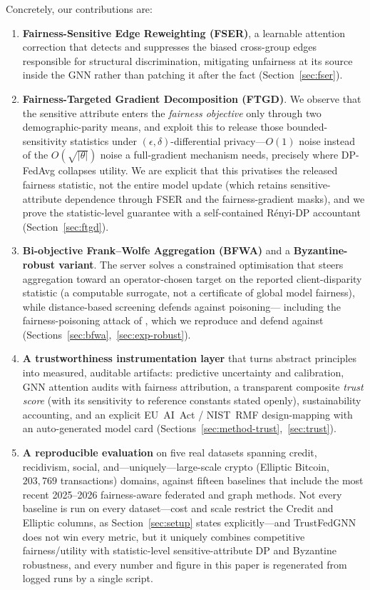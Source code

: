 \documentclass[pdflatex,sn-mathphys-num]{sn-jnl}
\theoremstyle{thmstyleone}%
\theoremstyle{thmstyletwo}%
\theoremstyle{thmstylethree}%
\begin{document}
\medskip
\noindent Concretely, our contributions are:
\begin{enumerate}
\item \textbf{Fairness-Sensitive Edge Reweighting (FSER)}, a learnable attention
correction that detects and suppresses the biased cross-group edges responsible
for structural discrimination, mitigating unfairness at its source inside the
GNN rather than patching it after the fact (Section~\ref{sec:fser}).

\item \textbf{Fairness-Targeted Gradient Decomposition (FTGD)}. We observe that
the sensitive attribute enters the \emph{fairness objective} only through two
demographic-parity means, and exploit this to release those bounded-sensitivity
statistics under $(\epsilon,\delta)$-differential privacy---$O(1)$ noise instead
of the $O(\sqrt{|\theta|})$ noise a full-gradient mechanism needs, precisely
where DP-FedAvg collapses utility. We are explicit that this privatises the
released fairness statistic, not the entire model update (which retains
sensitive-attribute dependence through FSER and the fairness-gradient masks),
and we prove the statistic-level guarantee with a self-contained R\'enyi-DP
accountant (Section~\ref{sec:ftgd}).

\item \textbf{Bi-objective Frank--Wolfe Aggregation (BFWA)} and a
\textbf{Byzantine-robust variant}. The server solves a constrained optimisation
that steers aggregation toward an operator-chosen target on the reported
client-disparity statistic (a computable surrogate, not a certificate of global
model fairness), while distance-based screening defends against poisoning---
including the fairness-poisoning attack of \cite{kasyap2025attack}, which we
reproduce and defend against (Sections~\ref{sec:bfwa},~\ref{sec:exp-robust}).

\item \textbf{A trustworthiness instrumentation layer} that turns abstract
principles into measured, auditable artifacts: predictive uncertainty and
calibration, GNN attention audits with fairness attribution, a transparent
composite \emph{trust score} (with its sensitivity to reference constants stated
openly), sustainability accounting, and an explicit EU~AI~Act / NIST~RMF
design-mapping with an auto-generated model card
(Sections~\ref{sec:method-trust},~\ref{sec:trust}).

\item \textbf{A reproducible evaluation} on five real datasets spanning credit,
recidivism, social, and---uniquely---large-scale crypto (Elliptic Bitcoin,
$203{,}769$ transactions) domains, against fifteen baselines that include the
most recent 2025--2026 fairness-aware federated and graph methods. Not every
baseline is run on every dataset---cost and scale restrict the Credit and
Elliptic columns, as Section~\ref{sec:setup} states explicitly---and TrustFedGNN
does not win every metric, but it uniquely combines competitive fairness/utility
with statistic-level sensitive-attribute DP and Byzantine robustness,
and every number and figure in this paper is regenerated from logged runs by a
single script.
\end{enumerate}
\end{document}
